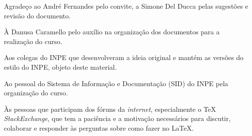 
\begin{agradecimentos}  %

\hypertarget{estilo:agradecimentos}{} %
Agradeço ao André Fernandes pelo convite, a Simone Del Ducca pelas sugestões e revisão do documento. 

À Danusa Caramello pelo auxílio na organização dos documentos para a realização do curso. 

Aos colegas do INPE que desenvolveram a ideia original e mantém as versões do estilo do INPE, objeto deste material.

Ao pessoal do Sistema de Informação e Documentação (SID) do INPE pela organização do curso.

Às pessoas que participam dos fóruns da \textit{internet}, especialmente o TeX \textit{StackExchange}, que tem a paciência e a motivação necessários para discutir, colaborar e responder às perguntas sobre como fazer no LaTeX.
\end{agradecimentos}